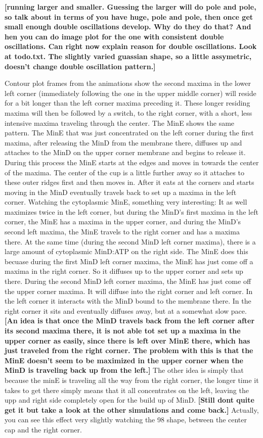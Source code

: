 \documentclass[letterpaper,twocolumn,amsmath,amssymb,pre]{revtex4-1}
\newcommand{\red}[1]{{\bf \color{red} #1}}
\newcommand{\fixme}[1]{\red{[#1]}}
\begin{document}
\fixme{running larger and smaller.  Guessing the larger will do pole
  and pole, so talk about in terms of you have huge, pole and pole,
  then once get small enough double oscillations develop.  Why do they
  do that?  And hen you can do image plot for the one with consistent
  double oscillations.  Can right now explain reason for double
  oscillations.  Look at todo.txt.  The slightly varied guassian shape,
  so a little assymetric, doesn't change double oscillation pattern.}

Contour plot frames from the animations show the second maxima in the
lower left corner (immediately following the one in the upper middle
corner) will reside for a bit longer than the left corner maxima
preceding it.  These longer residing maxima will then be followed by a
switch, to the right corner, with a short, less intensive maxima
traveling through the center.  The MinE shows the same pattern. The
MinE that was just concentrated on the left corner during the first
maxima, after releasing the MinD from the membrane there, diffuses up
and attaches to the MinD on the upper corner membrane and begins to
release it.  During this process the MinE starts at the edges and
moves in towards the center of the maxima.  The center of the cup is a
little further away so it attaches to these outer ridges first and
then moves in.  After it eats at the corners and starts moving in the
MinD eventually travels back to set up a maxima in the left corner.
Watching the cytoplasmic MinE, something very interesting: It as well
maximizes twice in the left corner, but during the MinD's first maxima
in the left corner, the MinE has a maxima in the upper corner, and
during the MinD's second left maxima, the MinE travels to the right
corner and has a maxima there.  At the same time (during the second
MinD left corner maxima), there is a large amount of cytoplasmic
MinD:ATP on the right side.  The MinE does this becuase during the
first MinD left corner maxima, the MinE has just come off a maxima in
the right corner.  So it diffuses up to the upper corner and sets up
there.  During the second MinD left corner maxima, the MinE has just
come off the upper corner maxima.  It will diffuse into the right
corner and left corner.  In the left corner it interacts with the MinD
bound to the membrane there.  In the right corner it sits and
eventually diffuses away, but at a somewhat slow pace.  \fixme{An idea
  is that once the MinD travels back from the left corner after its
  second maxima there, it is not able tot set up a maxima in the upper
  corner as easily, since there is left over MinE there, which has
  just traveled from the right corner.  The problem with this is that
  the MinE doesn't seem to be maximized in the upper corner when the
  MinD is traveling back up from the left.}  The other idea is simply
that because the minE is traveling all the way from the right corner,
the longer time it takes to get there simply means that it all
concentrates on the left, leaving the upp and right side completely
open for the build up of MinD.  \fixme{Still dont quite get it but
  take a look at the other simulations and come back.} Actually, you
can see this effect very slightly watching the 98 shape, between the
center cap and the right corner.
\end{document}
